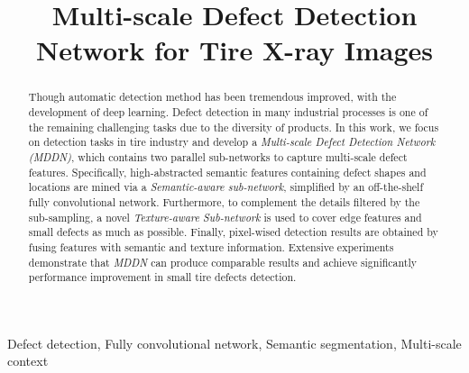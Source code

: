 \documentclass{article}
\title{Multi-scale Defect Detection Network for Tire X-ray Images}
\begin{document}

\maketitle

\begin{abstract}
Though automatic detection method has been tremendous improved, with the development of deep learning. Defect detection in many industrial processes is one of the remaining challenging tasks due to the diversity of products. In this work, we focus on detection tasks in tire industry and develop a {\it Multi-scale Defect Detection Network (MDDN)}, which contains two parallel sub-networks to capture multi-scale defect features. Specifically, high-abstracted semantic features containing defect shapes and locations are mined via a {\it Semantic-aware sub-network}, simplified by an off-the-shelf fully convolutional network. Furthermore, to complement the details filtered by the sub-sampling, a novel {\it Texture-aware Sub-network} is used to cover edge features and small defects as much as possible. Finally, pixel-wised detection results are obtained by fusing features with semantic and texture information. Extensive experiments demonstrate that {\it MDDN} can produce comparable results and achieve significantly performance improvement in small tire defects detection.
\end{abstract}

\begin{keywords}
Defect detection, Fully convolutional network, Semantic segmentation, Multi-scale context
\end{keywords}
\end{document}
